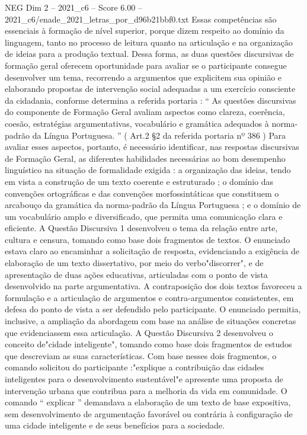 \begin{textsample}{NEG Dim 2 – 2021\_c6 – Score 6.00 – 2021\_c6/enade\_2021\_letras\_por\_d96b21bbf0.txt}
Essas competências são essenciais à formação de nível superior, porque dizem respeito ao domínio da linguagem, tanto no processo de leitura quanto na articulação e na organização de ideias para a produção textual.
Dessa forma, as duas questões discursivas de formação geral oferecem oportunidade para avaliar se o participante consegue desenvolver um tema, recorrendo a argumentos que explicitem sua opinião e elaborando propostas de intervenção social adequadas a um exercício consciente da cidadania, conforme determina a referida portaria : “ As questões discursivas do componente de Formação Geral avaliam aspectos como clareza, coerência, coesão, estratégias argumentativas, vocabulário e gramática adequados à norma-padrão da Língua Portuguesa. ” ( Art.2 §2 da referida portaria nº 386 ) Para avaliar esses aspectos, portanto, é necessário identificar, nas respostas discursivas de Formação Geral, as diferentes habilidades necessárias ao bom desempenho linguístico na situação de formalidade exigida : a organização das ideias, tendo em vista a construção de um texto coerente e estruturado ; o domínio das convenções ortográficas e das convenções morfossintáticas que constituem o arcabouço da gramática da norma-padrão da Língua Portuguesa ; e o domínio de um vocabulário amplo e diversificado, que permita uma comunicação clara e eficiente.
A Questão Discursiva 1 desenvolveu o tema da relação entre arte, cultura e censura, tomando como base dois fragmentos de textos.
O enunciado estava claro ao encaminhar a solicitação de resposta, evidenciando a exigência de elaboração de um texto dissertativo, por meio do verbo"discorrer", e de apresentação de duas ações educativas, articuladas com o ponto de vista desenvolvido na parte argumentativa.
A contraposição dos dois textos favoreceu a formulação e a articulação de argumentos e contra-argumentos consistentes, em defesa do ponto de vista a ser defendido pelo participante.
O enunciado permitia, inclusive, a ampliação da abordagem com base na análise de situações concretas que evidenciassem essa articulação.
A Questão Discursiva 2 desenvolveu o conceito de"cidade inteligente", tomando como base dois fragmentos de estudos que descreviam as suas características.
Com base nesses dois fragmentos, o comando solicitou do participante :"explique a contribuição das cidades inteligentes para o desenvolvimento sustentável"e apresente uma proposta de intervenção urbana que contribua para a melhoria da vida em comunidade.
O comando “ explicar ” demandava a elaboração de um texto de base expositiva, sem desenvolvimento de argumentação favorável ou contrária à configuração de uma cidade inteligente e de seus benefícios para a sociedade.

\end{textsample}
